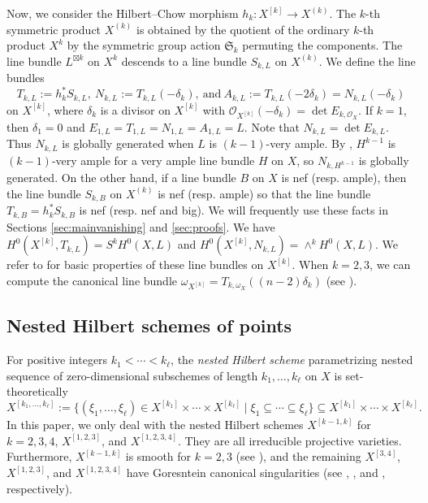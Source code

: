 \documentclass{amsart}
\theoremstyle{plain}
\theoremstyle{definition}
\theoremstyle{remark}
\begin{document}
Now, we consider the Hilbert--Chow morphism $h_k \colon X^{[k]} \to X^{(k)}$. The $k$-th symmetric product $X^{(k)}$ is obtained by the quotient of the ordinary $k$-th product $X^k$ by the symmetric group action $\mathfrak{S}_k$ permuting the components. The line bundle $L^{\boxtimes k}$ on $X^k$ descends to a line bundle $S_{k,L}$ on $X^{(k)}$. We define the line bundles
$$
T_{k,L}:= h_k^* S_{k,L}, ~N_{k,L}:= T_{k,L}(-\delta_k),~\text{and}~ A_{k,L}:= T_{k,L}(-2\delta_k) = N_{k,L}(-\delta_k)
$$
on $X^{[k]}$, where $\delta_k$ is a divisor on $X^{[k]}$ with $\mathcal{O}_{X^{[k]}}(-\delta_k) = \det E_{k, \mathcal{O}_X}$.  If $k=1$, then $\delta_1=0$ and $E_{1,L}=T_{1,L}=N_{1,L}=A_{1,L}=L$.  Note that $N_{k,L}=\det E_{k,L}$. Thus $N_{k,L}$ is globally generated when $L$ is $(k-1)$-very ample. By \cite[Theorem 1.1]{HTT}, $H^{k-1}$ is $(k-1)$-very ample for a very ample line bundle $H$ on $X$, so $N_{k, H^{k-1}}$ is globally generated. On the other hand, if a line bundle $B$ on $X$ is nef (resp. ample), then the line bundle $S_{k,B}$ on $X^{(k)}$ is nef (resp. ample) so that the line bundle $T_{k,B}=h_k^* S_{k,B}$ is nef (resp. nef and big). 
We will frequently use these facts in Sections \ref{sec:mainvanishing} and \ref{sec:proofs}. 
We have $H^0(X^{[k]}, T_{k,L})= S^k H^0(X, L)$ and $H^0(X^{[k]}, N_{k,L})= \wedge^k H^0(X, L)$. We refer to \cite[\S 2.3.2]{Choi.Lacini.Park.Sheridan.25} for basic properties of these line bundles on $X^{[k]}$. When $k=2,3$, we can compute the canonical line bundle $\omega_{X^{[k]}} = T_{k, \omega_X}((n-2)\delta_k)$ (see \cite[\S 1.1.7]{Choi.Lacini.Park.Sheridan.25}).

\subsection{Nested Hilbert schemes of points}
For positive integers $k_1 < \cdots < k_{\ell}$, the \emph{nested Hilbert scheme} parametrizing nested sequence of zero-dimensional subschemes of length $k_1, \ldots, k_{\ell}$ on $X$ is set-theoretically
$$
X^{[k_1, \ldots, k_{\ell}]} := \{ (\xi_1, \ldots, \xi_{\ell}) \in X^{[k_1]} \times \cdots \times X^{[k_{\ell}]} \mid \xi_1 \subseteq \cdots \subseteq \xi_{\ell} \} \subseteq X^{[k_1]} \times \cdots \times X^{[k_{\ell}]}.
$$
In this paper, we only deal with the nested Hilbert schemes $X^{[k-1,k]}$ for $k=2,3,4$, $X^{[1,2,3]}$, and $X^{[1,2,3,4]}$. They are all irreducible projective varieties. Furthermore, $X^{[k-1,k]}$ is smooth for $k=2,3$ (see \cite{Cheah}), and the remaining $X^{[3,4]}$, $X^{[1,2,3]}$, and $X^{[1,2,3,4]}$  have Goresntein canonical singularities (see \cite[Theorem 1.2]{Choi.25}, \cite[Lemma 4.20]{Choi.Lacini.Park.Sheridan.25}, and \cite[Corollary 4.3]{Choi.25}, respectively).
\end{document}
